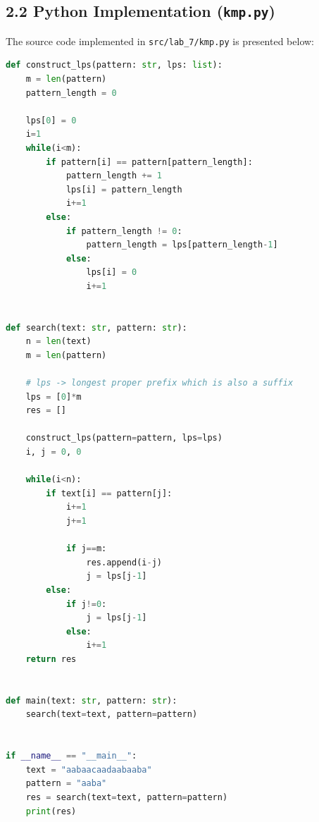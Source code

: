 \documentclass[12pt]{article}
\begin{document}
\subsection*{2.2 Python Implementation (\texttt{kmp.py})}
The source code implemented in \texttt{src/lab\_7/kmp.py} is presented below:

\begin{lstlisting}[language=Python]
def construct_lps(pattern: str, lps: list):
    m = len(pattern)
    pattern_length = 0

    lps[0] = 0
    i=1
    while(i<m):
        if pattern[i] == pattern[pattern_length]:
            pattern_length += 1
            lps[i] = pattern_length
            i+=1
        else:
            if pattern_length != 0:
                pattern_length = lps[pattern_length-1]
            else:
                lps[i] = 0
                i+=1


def search(text: str, pattern: str):
    n = len(text)
    m = len(pattern)

    # lps -> longest proper prefix which is also a suffix
    lps = [0]*m
    res = []

    construct_lps(pattern=pattern, lps=lps)
    i, j = 0, 0

    while(i<n):
        if text[i] == pattern[j]:
            i+=1
            j+=1

            if j==m:
                res.append(i-j)
                j = lps[j-1]
        else:
            if j!=0:
                j = lps[j-1]
            else:
                i+=1
    return res


def main(text: str, pattern: str):
    search(text=text, pattern=pattern)


if __name__ == "__main__":
    text = "aabaacaadaabaaba"
    pattern = "aaba"
    res = search(text=text, pattern=pattern)
    print(res)
\end{lstlisting}
\end{document}
